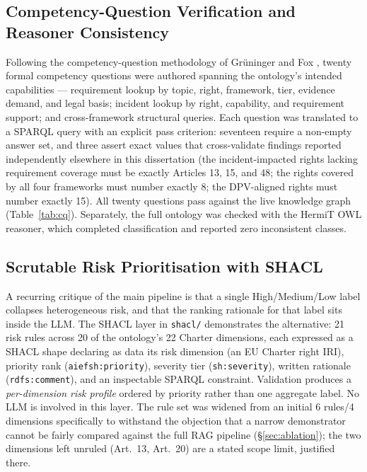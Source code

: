 \subsection{Competency-Question Verification and Reasoner Consistency}
\label{sec:cq-validation}

Following the competency-question methodology of Gr\"{u}ninger and Fox \cite{gruninger1995}, twenty formal competency questions were authored spanning the ontology's intended capabilities --- requirement lookup by topic, right, framework, tier, evidence demand, and legal basis; incident lookup by right, capability, and requirement support; and cross-framework structural queries. Each question was translated to a SPARQL query with an explicit pass criterion: seventeen require a non-empty answer set, and three assert exact values that cross-validate findings reported independently elsewhere in this dissertation (the incident-impacted rights lacking requirement coverage must be exactly Articles 13, 15, and 48; the rights covered by all four frameworks must number exactly 8; the DPV-aligned rights must number exactly 15). All twenty questions pass against the live knowledge graph (Table~\ref{tab:cq}). Separately, the full ontology was checked with the HermiT OWL reasoner, which completed classification and reported zero inconsistent classes.

\begin{table}[htbp]
\centering
\caption{Competency-question verification results (20/20 pass, 16 July 2026).}
\label{tab:cq}
\small

\end{table}


\subsection{Scrutable Risk Prioritisation with SHACL}
\label{sec:shacl}

A recurring critique of the main pipeline is that a single High/Medium/Low label collapses heterogeneous risk, and that the ranking rationale for that label sits inside the LLM. The SHACL layer in \texttt{shacl/} demonstrates the alternative: 21 risk rules across 20 of the ontology's 22 Charter dimensions, each expressed as a SHACL shape declaring as data its risk dimension (an EU Charter right IRI), priority rank (\texttt{aiefsh:priority}), severity tier (\texttt{sh:severity}), written rationale (\texttt{rdfs:comment}), and an inspectable SPARQL constraint. Validation produces a \emph{per-dimension risk profile} ordered by priority rather than one aggregate label. No LLM is involved in this layer. The rule set was widened from an initial 6 rules/4 dimensions specifically to withstand the objection that a narrow demonstrator cannot be fairly compared against the full RAG pipeline (\S\ref{sec:ablation}); the two dimensions left unruled (Art.~13, Art.~20) are a stated scope limit, justified there.

